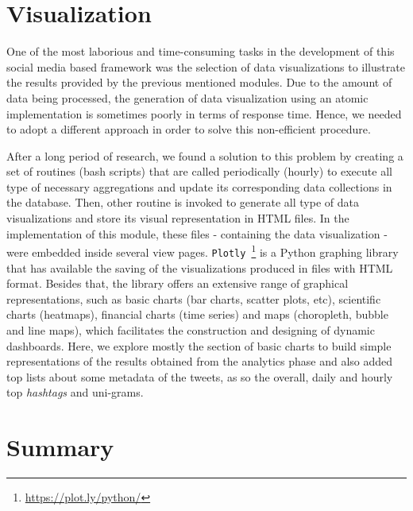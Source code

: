 \section{Visualization}\label{sec:visualization}

One of the most laborious and time-consuming tasks in the development of this social media based framework was the selection of data visualizations to illustrate the results provided by the previous mentioned modules. Due to the amount of data being processed, the generation of data visualization using an atomic implementation is sometimes poorly in terms of response time. Hence, we needed to adopt a different approach in order to solve this non-efficient procedure.

After a long period of research, we found a solution to this problem by creating a set of routines (bash scripts) that are called periodically (hourly) to execute all type of necessary aggregations and update its corresponding data collections in the database. Then, other routine is invoked to generate all type of data visualizations and store its visual representation in HTML files. In the implementation of this module, these files - containing the data visualization - were embedded inside several view pages. \texttt{Plotly}~\footnote{\url{https://plot.ly/python/}} is a Python graphing library that has available the saving of the visualizations produced in files with HTML format. Besides that, the library offers an extensive range of graphical representations, such as basic charts (bar charts, scatter plots, etc), scientific charts (heatmaps), financial charts (time series) and maps (choropleth, bubble and line maps), which facilitates the construction and designing of dynamic dashboards. Here, we explore mostly the section of basic charts to build simple representations of the results obtained from the analytics phase and also added top lists about some metadata of the tweets, as so the overall, daily and hourly top \textit{hashtags} and uni-grams.

\section{Summary}
